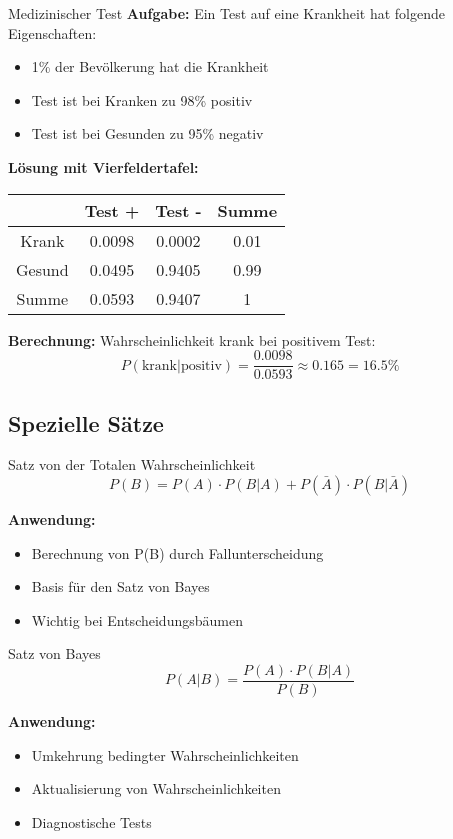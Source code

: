 \begin{example}{Medizinischer Test}
\textbf{Aufgabe:} Ein Test auf eine Krankheit hat folgende Eigenschaften:
\begin{itemize}
\item 1\% der Bevölkerung hat die Krankheit
\item Test ist bei Kranken zu 98\% positiv
\item Test ist bei Gesunden zu 95\% negativ
\end{itemize}

\textbf{Lösung mit Vierfeldertafel:}
\begin{center}
\begin{tabular}{|c|c|c|c|}
\hline
 & Test + & Test - & Summe \\
\hline
Krank & 0.0098 & 0.0002 & 0.01 \\
\hline
Gesund & 0.0495 & 0.9405 & 0.99 \\
\hline
Summe & 0.0593 & 0.9407 & 1 \\
\hline
\end{tabular}
\end{center}

\textbf{Berechnung:} Wahrscheinlichkeit krank bei positivem Test:
$$P(\text{krank}|\text{positiv}) = \frac{0.0098}{0.0593} \approx 0.165 = 16.5\%$$
\end{example}

\subsection{Spezielle Sätze}

\begin{theorem}{Satz von der Totalen Wahrscheinlichkeit}
$$P(B)=P(A) \cdot P(B|A)+P(\bar{A}) \cdot P(B|\bar{A})$$

\textbf{Anwendung:}
\begin{itemize}
    \item Berechnung von P(B) durch Fallunterscheidung
    \item Basis für den Satz von Bayes
    \item Wichtig bei Entscheidungsbäumen
\end{itemize}
\end{theorem}

\begin{theorem}{Satz von Bayes}
$$P(A|B)=\frac{P(A) \cdot P(B|A)}{P(B)}$$

\textbf{Anwendung:}
\begin{itemize}
    \item Umkehrung bedingter Wahrscheinlichkeiten
    \item Aktualisierung von Wahrscheinlichkeiten
    \item Diagnostische Tests
\end{itemize}
\end{theorem}

